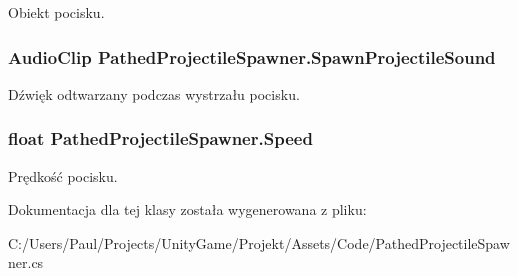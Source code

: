 Obiekt pocisku. 

\subsubsection[{Spawn\+Projectile\+Sound}]{\setlength{\rightskip}{0pt plus 5cm}Audio\+Clip Pathed\+Projectile\+Spawner.\+Spawn\+Projectile\+Sound}\label{class_pathed_projectile_spawner_ab653acbecff474b6e0f58db623b1acea}


Dźwięk odtwarzany podczas wystrzału pocisku. 

\subsubsection[{Speed}]{\setlength{\rightskip}{0pt plus 5cm}float Pathed\+Projectile\+Spawner.\+Speed}\label{class_pathed_projectile_spawner_a03c624ef3218b0cc67b1a6c68479339d}


Prędkość pocisku. 



Dokumentacja dla tej klasy została wygenerowana z pliku\+:\begin{DoxyCompactItemize}
\item 
C\+:/\+Users/\+Paul/\+Projects/\+Unity\+Game/\+Projekt/\+Assets/\+Code/Pathed\+Projectile\+Spawner.\+cs\end{DoxyCompactItemize}
